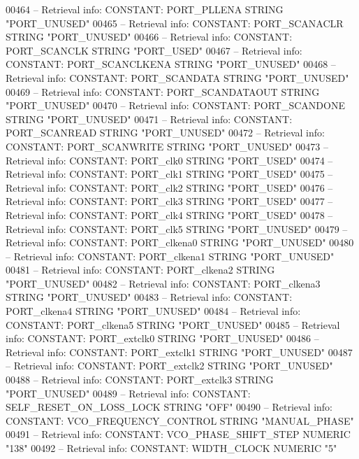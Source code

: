 \begin{DoxyCode}
{00464 \textcolor{keyword}{-- Retrieval info: CONSTANT: PORT\_PLLENA STRING "PORT\_UNUSED"}
00465 \textcolor{keyword}{-- Retrieval info: CONSTANT: PORT\_SCANACLR STRING "PORT\_UNUSED"}
00466 \textcolor{keyword}{-- Retrieval info: CONSTANT: PORT\_SCANCLK STRING "PORT\_USED"}
00467 \textcolor{keyword}{-- Retrieval info: CONSTANT: PORT\_SCANCLKENA STRING "PORT\_UNUSED"}
00468 \textcolor{keyword}{-- Retrieval info: CONSTANT: PORT\_SCANDATA STRING "PORT\_UNUSED"}
00469 \textcolor{keyword}{-- Retrieval info: CONSTANT: PORT\_SCANDATAOUT STRING "PORT\_UNUSED"}
00470 \textcolor{keyword}{-- Retrieval info: CONSTANT: PORT\_SCANDONE STRING "PORT\_UNUSED"}
00471 \textcolor{keyword}{-- Retrieval info: CONSTANT: PORT\_SCANREAD STRING "PORT\_UNUSED"}
00472 \textcolor{keyword}{-- Retrieval info: CONSTANT: PORT\_SCANWRITE STRING "PORT\_UNUSED"}
00473 \textcolor{keyword}{-- Retrieval info: CONSTANT: PORT\_clk0 STRING "PORT\_USED"}
00474 \textcolor{keyword}{-- Retrieval info: CONSTANT: PORT\_clk1 STRING "PORT\_USED"}
00475 \textcolor{keyword}{-- Retrieval info: CONSTANT: PORT\_clk2 STRING "PORT\_USED"}
00476 \textcolor{keyword}{-- Retrieval info: CONSTANT: PORT\_clk3 STRING "PORT\_USED"}
00477 \textcolor{keyword}{-- Retrieval info: CONSTANT: PORT\_clk4 STRING "PORT\_USED"}
00478 \textcolor{keyword}{-- Retrieval info: CONSTANT: PORT\_clk5 STRING "PORT\_UNUSED"}
00479 \textcolor{keyword}{-- Retrieval info: CONSTANT: PORT\_clkena0 STRING "PORT\_UNUSED"}
00480 \textcolor{keyword}{-- Retrieval info: CONSTANT: PORT\_clkena1 STRING "PORT\_UNUSED"}
00481 \textcolor{keyword}{-- Retrieval info: CONSTANT: PORT\_clkena2 STRING "PORT\_UNUSED"}
00482 \textcolor{keyword}{-- Retrieval info: CONSTANT: PORT\_clkena3 STRING "PORT\_UNUSED"}
00483 \textcolor{keyword}{-- Retrieval info: CONSTANT: PORT\_clkena4 STRING "PORT\_UNUSED"}
00484 \textcolor{keyword}{-- Retrieval info: CONSTANT: PORT\_clkena5 STRING "PORT\_UNUSED"}
00485 \textcolor{keyword}{-- Retrieval info: CONSTANT: PORT\_extclk0 STRING "PORT\_UNUSED"}
00486 \textcolor{keyword}{-- Retrieval info: CONSTANT: PORT\_extclk1 STRING "PORT\_UNUSED"}
00487 \textcolor{keyword}{-- Retrieval info: CONSTANT: PORT\_extclk2 STRING "PORT\_UNUSED"}
00488 \textcolor{keyword}{-- Retrieval info: CONSTANT: PORT\_extclk3 STRING "PORT\_UNUSED"}
00489 \textcolor{keyword}{-- Retrieval info: CONSTANT: SELF\_RESET\_ON\_LOSS\_LOCK STRING "OFF"}
00490 \textcolor{keyword}{-- Retrieval info: CONSTANT: VCO\_FREQUENCY\_CONTROL STRING "MANUAL\_PHASE"}
00491 \textcolor{keyword}{-- Retrieval info: CONSTANT: VCO\_PHASE\_SHIFT\_STEP NUMERIC "138"}
00492 \textcolor{keyword}{-- Retrieval info: CONSTANT: WIDTH\_CLOCK NUMERIC "5"}
}
\end{DoxyCode}
